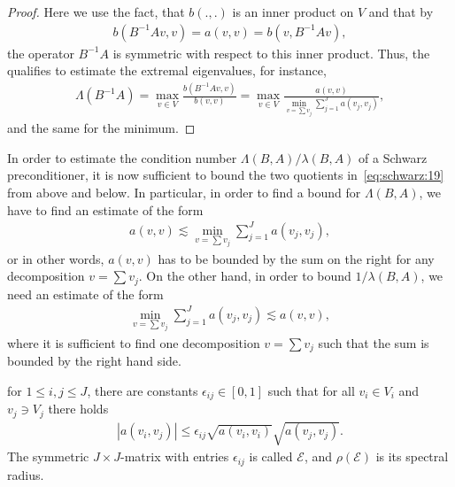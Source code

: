 \begin{proof}
  Here we use the fact, that $b(.,.)$ is an inner product on
  $V$ and that by
  \begin{gather*}
    b(B^{-1}A v,v) = a(v,v) = b(v, B^{-1}A v),
  \end{gather*}
  the operator $B^{-1}A$ is symmetric with respect to this inner
  product. Thus, the  qualifies to
  estimate the extremal eigenvalues, for instance,
  \begin{gather*}
    \Lambda(B^{-1}A)
    = \max_{v\in V} \frac{b(B^{-1}A v,v)}{b(v,v)}
    = \max_{v\in V} \frac{a(v,v)}{\min\limits_{v=\sum v_j}
      \sum\limits_{j=1}^J a(v_j, v_j)},
  \end{gather*}
  and the same for the minimum.
\end{proof}

\begin{note}
  \label{note:schwarz:1}
  In order to estimate the condition number $\Lambda(B,A)/\lambda(B,A)$ of a Schwarz
  preconditioner, it is now sufficient to bound the two quotients
  in~\eqref{eq:schwarz:19} from above and below. In particular, in
  order to find a bound for $\Lambda(B,A)$, we have to find an estimate of
  the form
  \begin{gather}
    \label{eq:schwarz:23}
    a(v,v) \lesssim \min_{v=\sum v_j}\sum_{j=1}^J a(v_j, v_j),
  \end{gather}
  or in other words, $a(v,v)$ has to be bounded by the sum on the
  right for any decomposition $v=\sum v_j$. On the other hand, in
  order to bound $1/\lambda(B,A)$, we need an estimate of the form
  \begin{gather}
    \label{eq:schwarz:24}
     \min_{v=\sum v_j}\sum_{j=1}^J a(v_j, v_j) \lesssim a(v,v),
  \end{gather}
  where it is sufficient to find one decomposition $v=\sum v_j$ such
  that the sum is bounded by the right hand side.
\end{note}

\begin{assumption}
  \label{assumption:schwarz:1}
  for $1\le i,j \le J$, there are constants $\epsilon_{ij} \in [0,1]$
  such that for all $v_i \in V_i$ and $v_j \ni V_j$ there holds
  \begin{gather}
    \label{eq:schwarz:25}
    \left| a(v_i, v_j)\right|
    \le \epsilon_{ij} \sqrt{a(v_i,v_i)} \sqrt{a(v_j,v_j)}.
  \end{gather}
  The symmetric $J\times J$-matrix with entries $\epsilon_{ij}$ is called
  $\mathcal E$, and $\rho(\mathcal E)$ is its spectral radius.
\end{assumption}

